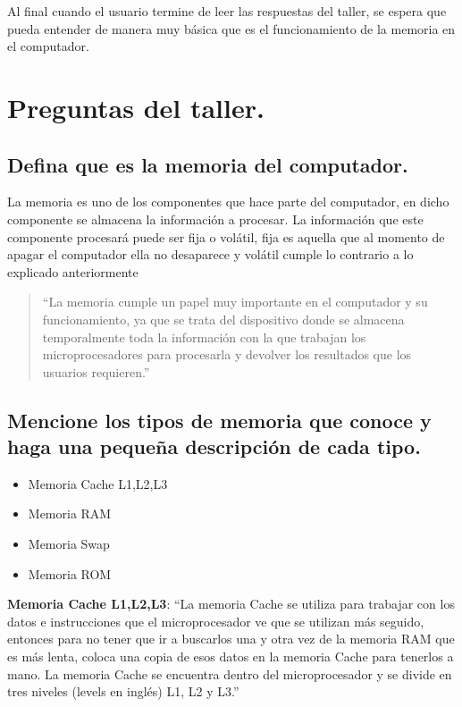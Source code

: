 \documentclass[12pt,letterpaper]{article}
\begin{document}
Al final cuando el usuario termine de leer las respuestas del taller, se espera que pueda entender de manera muy básica que es el funcionamiento de la memoria en el computador.\\


\newpage


\section{Preguntas del taller.}\label{preguntas}
    \subsection{Defina que es la memoria del computador.}

La memoria es uno de los componentes que hace parte del computador, en dicho componente se almacena la información a procesar. La información que este componente procesará puede ser fija o volátil, fija es aquella que al momento de apagar el computador ella no desaparece y volátil cumple lo contrario a lo explicado anteriormente

        \begin{quote}
            ``La memoria cumple un papel muy importante en el computador y su funcionamiento, ya que se
            trata del dispositivo donde se almacena temporalmente toda la información con la que trabajan
            los microprocesadores para procesarla y devolver los resultados que los usuarios requieren.''\cite{GuiaProfesor}
        \end{quote}

    \subsection{Mencione los tipos de memoria que conoce y haga una pequeña descripción de cada tipo.}
        \begin{itemize}
         \item Memoria Cache L1,L2,L3
         \item Memoria RAM
         \item Memoria Swap
         \item Memoria ROM
        \end{itemize}

        \textbf{Memoria Cache L1,L2,L3}: ``La memoria Cache se utiliza para trabajar con los datos e instrucciones que el microprocesador ve que se utilizan más seguido, entonces para no tener que ir a buscarlos una y otra vez de la memoria RAM que es más lenta, coloca una copia de esos datos en la memoria Cache para tenerlos a mano. La memoria Cache se encuentra dentro del microprocesador y se divide en tres niveles (levels en inglés) L1, L2 y L3.''\cite{GuiaProfesor} 
\end{document}

